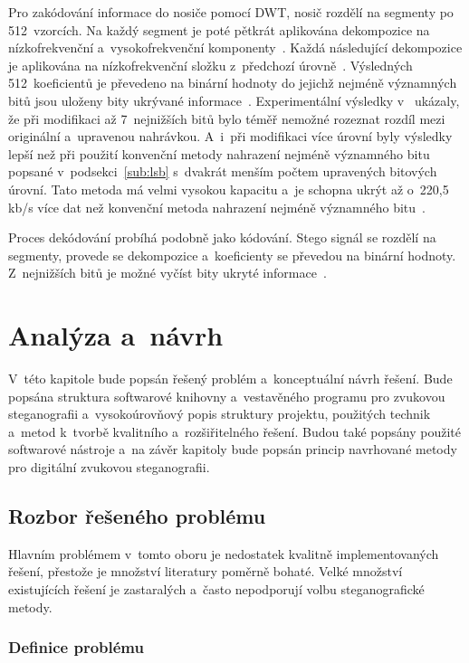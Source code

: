 Pro zakódování informace do nosiče pomocí DWT, nosič rozdělí na segmenty po
512~vzorcích. Na každý segment je poté pětkrát aplikována dekompozice na
nízkofrekvenční a~vysokofrekvenční komponenty~\cite{Cvejic2002Wavelet}. Každá
následující dekompozice je aplikována na nízkofrekvenční složku z~předchozí
úrovně~\cite{Prabakaran2012}. Výsledných 512~koeficientů je převedeno na
binární hodnoty do jejichž nejméně významných bitů jsou uloženy bity ukrývané
informace~\cite{Cvejic2002Wavelet}. Experimentální výsledky
v~\cite{Cvejic2002Wavelet} ukázaly, že při modifikaci až 7~nejnižších bitů bylo
téměř nemožné rozeznat rozdíl mezi originální a~upravenou nahrávkou. A~i~při
modifikaci více úrovní byly výsledky lepší než při použití konvenční metody
nahrazení nejméně významného bitu popsané v~podsekci~\ref{sub:lsb} s~dvakrát
menším počtem upravených bitových úrovní. Tato metoda má velmi vysokou kapacitu
a~je schopna ukrýt až o~220,5\,kb/s více dat než konvenční metoda nahrazení
nejméně významného bitu~\cite{Cvejic2002Wavelet}.

Proces dekódování probíhá podobně jako kódování. Stego signál se rozdělí na
segmenty, provede se dekompozice a~koeficienty se převedou na binární hodnoty.
Z~nejnižších bitů je možné vyčíst bity ukryté informace~\cite{Pooyan2007}.


\chapter{Analýza a~návrh}
\label{cha:library-design}

V~této kapitole bude popsán řešený problém a~konceptuální návrh řešení. Bude
popsána struktura softwarové knihovny a~vestavěného programu pro zvukovou
steganografii a~vysokoúrovňový popis struktury projektu, použitých technik
a~metod k~tvorbě kvalitního a~rozšiřitelného řešení. Budou také popsány použité
softwarové nástroje a~na závěr kapitoly bude popsán princip navrhované metody
pro digitální zvukovou steganografii.

\section{Rozbor řešeného problému}
\label{sec:problem-analysis}

Hlavním problémem v~tomto oboru je nedostatek kvalitně implementovaných řešení,
přestože je množství literatury poměrně bohaté. Velké množství existujících
řešení je zastaralých a~často nepodporují volbu steganografické metody.

\subsection*{Definice problému}
\label{sub:problem-definition}

